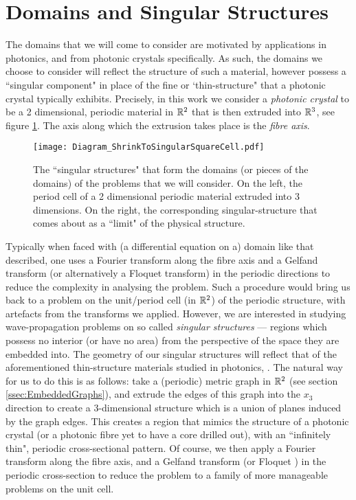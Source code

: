 \section{Domains and Singular Structures} \label{sec:SingularStructures}


The domains that we will come to consider are motivated by applications in photonics, and from photonic crystals specifically.
As such, the domains we choose to consider will reflect the structure of such a material, however possess a ``singular component" in place of the fine or `thin-structure" that a photonic crystal typically exhibits.
Precisely, in this work we consider a \emph{photonic crystal} to be a 2 dimensional, periodic material in $\mathbb{R}^2$ that is then extruded into $\mathbb{R}^3$, see figure \ref{fig:Diagram_ShrinkToSingularSquareCell}.
The axis along which the extrusion takes place is the \emph{fibre axis}.
\begin{figure}
	\centering
	\texttt{[image: Diagram\_ShrinkToSingularSquareCell.pdf]}
	\caption{\label{fig:Diagram_ShrinkToSingularSquareCell} The ``singular structures" that form the domains (or pieces of the domains) of the problems that we will consider. On the left, the period cell of a 2 dimensional periodic material extruded into 3 dimensions. On the right, the corresponding singular-structure that comes about as a ``limit" of the physical structure.}
\end{figure}
Typically when faced with (a differential equation on a) domain like that described, one uses a Fourier transform along the fibre axis and a Gelfand transform (or alternatively a Floquet transform) in the periodic directions to reduce the complexity in analysing the problem.
Such a procedure would bring us back to a problem on the unit/period cell (in $\mathbb{R}^2$) of the periodic structure, with artefacts from the transforms we applied.
However, we are interested in studying wave-propagation problems on so called \emph{singular structures} ---
regions which possess no interior (or have no area) from the perspective of the space they are embedded into.
The geometry of our singular structures will reflect that of the aforementioned thin-structure materials studied in photonics, .
The natural way for us to do this is as follows: take a (periodic) metric graph in $\mathbb{R}^2$ (see section \ref{ssec:EmbeddedGraphs}), and extrude the edges of this graph into the $x_3$ direction to create a 3-dimensional structure which is a union of planes induced by the graph edges.
This creates a region that mimics the structure of a photonic crystal (or a photonic fibre yet to have a core drilled out), with an ``infinitely thin", periodic cross-sectional pattern.
Of course, we then apply a Fourier transform along the fibre axis, and a Gelfand transform (or Floquet ) in the periodic cross-section to reduce the problem to a family of more manageable problems on the unit cell.

